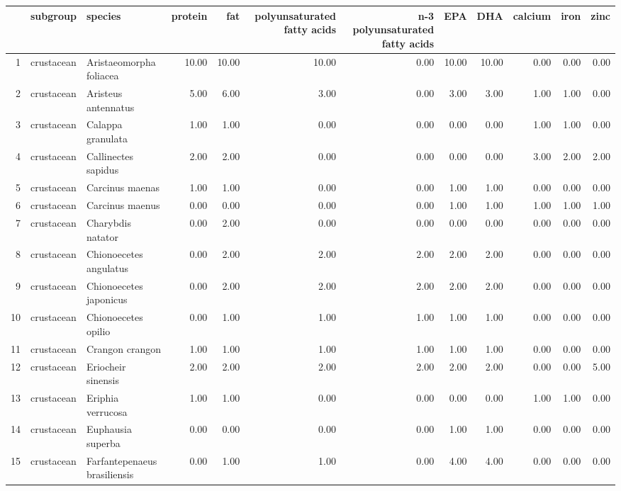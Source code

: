 \begin{table}[ht]
\centering
\begin{tabular}{rllrrrrrrrrr}
  \hline
 & subgroup & species & protein & fat & polyunsaturated fatty acids & n-3 polyunsaturated fatty acids & EPA & DHA & calcium & iron & zinc \\ 
  \hline
1 & crustacean & Aristaeomorpha foliacea & 10.00 & 10.00 & 10.00 & 0.00 & 10.00 & 10.00 & 0.00 & 0.00 & 0.00 \\ 
  2 & crustacean & Aristeus antennatus & 5.00 & 6.00 & 3.00 & 0.00 & 3.00 & 3.00 & 1.00 & 1.00 & 0.00 \\ 
  3 & crustacean & Calappa granulata & 1.00 & 1.00 & 0.00 & 0.00 & 0.00 & 0.00 & 1.00 & 1.00 & 0.00 \\ 
  4 & crustacean & Callinectes sapidus & 2.00 & 2.00 & 0.00 & 0.00 & 0.00 & 0.00 & 3.00 & 2.00 & 2.00 \\ 
  5 & crustacean & Carcinus maenas & 1.00 & 1.00 & 0.00 & 0.00 & 1.00 & 1.00 & 0.00 & 0.00 & 0.00 \\ 
  6 & crustacean & Carcinus maenus & 0.00 & 0.00 & 0.00 & 0.00 & 1.00 & 1.00 & 1.00 & 1.00 & 1.00 \\ 
  7 & crustacean & Charybdis natator & 0.00 & 2.00 & 0.00 & 0.00 & 0.00 & 0.00 & 0.00 & 0.00 & 0.00 \\ 
  8 & crustacean & Chionoecetes angulatus & 0.00 & 2.00 & 2.00 & 2.00 & 2.00 & 2.00 & 0.00 & 0.00 & 0.00 \\ 
  9 & crustacean & Chionoecetes japonicus & 0.00 & 2.00 & 2.00 & 2.00 & 2.00 & 2.00 & 0.00 & 0.00 & 0.00 \\ 
  10 & crustacean & Chionoecetes opilio & 0.00 & 1.00 & 1.00 & 1.00 & 1.00 & 1.00 & 0.00 & 0.00 & 0.00 \\ 
  11 & crustacean & Crangon crangon & 1.00 & 1.00 & 1.00 & 1.00 & 1.00 & 1.00 & 0.00 & 0.00 & 0.00 \\ 
  12 & crustacean & Eriocheir sinensis & 2.00 & 2.00 & 2.00 & 2.00 & 2.00 & 2.00 & 0.00 & 0.00 & 5.00 \\ 
  13 & crustacean & Eriphia verrucosa & 1.00 & 1.00 & 0.00 & 0.00 & 0.00 & 0.00 & 1.00 & 1.00 & 0.00 \\ 
  14 & crustacean & Euphausia superba & 0.00 & 0.00 & 0.00 & 0.00 & 1.00 & 1.00 & 0.00 & 0.00 & 0.00 \\ 
  15 & crustacean & Farfantepenaeus brasiliensis & 0.00 & 1.00 & 1.00 & 0.00 & 4.00 & 4.00 & 0.00 & 0.00 & 0.00 \\ 

\end{tabular}
\end{table}
